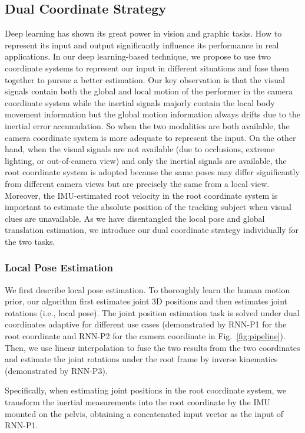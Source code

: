 \documentclass[sigconf,nonacm=true]{acmart}
\begin{document}
\subsection{Dual Coordinate Strategy}\label{subsubsec:dual-coordinate}
Deep learning has shown its great power in vision and graphic tasks.
How to represent its input and output significantly influence its performance in real applications.
In our deep learning-based technique, we propose to use two coordinate systems to represent our input in different situations and fuse them together to pursue a better estimation.
Our key observation is that the visual signals contain both the global and local motion of the performer in the camera coordinate system while the inertial signals majorly contain the local body movement information but the global motion information always drifts due to the inertial error accumulation.
So when the two modalities are both available, the camera coordinate system is more adequate to represent the input.
On the other hand, when the visual signals are not available (due to occlusions, extreme lighting, or out-of-camera view) and only the inertial signals are available, the root coordinate system is adopted because the same poses may differ significantly from different camera views but are precisely the same from a local view.
Moreover, the IMU-estimated root velocity in the root coordinate system is important to estimate the absolute position of the tracking subject when visual clues are unavailable.
As we have disentangled the local pose and global translation estimation, we introduce our dual coordinate strategy individually for the two tasks.\subsubsection{Local Pose Estimation}\label{subsubsec:Pose}
We first describe local pose estimation.
To thoroughly learn the human motion prior, our algorithm first estimates joint 3D positions and then estimates joint rotations (i.e., local pose).
The joint position estimation task is solved under dual coordinates adaptive for different use cases (demonstrated by RNN-P1 for the root coordinate and RNN-P2 for the camera coordinate in Fig.~\ref{fig:pipeline}).
Then, we use linear interpolation to fuse the two results from the two coordinates and estimate the joint rotations under the root frame by inverse kinematics (demonstrated by RNN-P3).
\par
Specifically, when estimating joint positions in the root coordinate system, we transform the inertial measurements into the root coordinate by the IMU mounted on the pelvis, obtaining a concatenated input vector as the input of RNN-P1.
\end{document}
